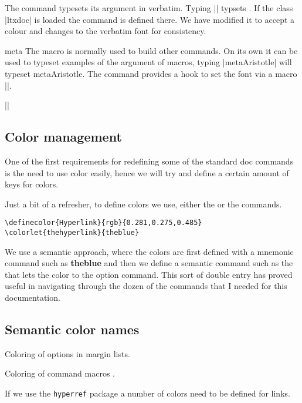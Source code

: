 \begin{macro}{\cmd} The command \cmd{\cmd} typesets its argument in
  verbatim. Typing |\cmd{\cmd}| typsets \cmd{\cmd}. If the class
  |ltxdoc| is loaded the command is defined there. We have modified
  it to accept a colour and changes to the verbatim font 
  for consistency.
\end{macro}

\begin{macro}{meta}
The macro  is normally used to build other commands. On its own it can be used to typeset
examples of the argument of macros, typing |meta{Aristotle}| will typeset meta{Aristotle}. The command provides a hook to set the font via a macro |\meta@font@select|. 
\end{macro}


|\def\meta@font@select{\upshape\color{black}}|


\subsection{Color management}
One of the first requirements for redefining some of the standard doc commands is the need to use color easily, hence we will try and define a certain amount of keys for colors.

Just a bit of a refresher, to define colors we use, either the  or the  commands.


\begin{verbatim}
\definecolor{Hyperlink}{rgb}{0.281,0.275,0.485}
\colorlet{thehyperlink}{theblue}
\end{verbatim}


We use a semantic approach, where the colors are first defined with a mnemonic command such as {\bfseries\textcolor{theblue}{theblue}} and then we define a semantic command such as the that lets the color to the option command. This sort of double entry has proved useful in navigating through the dozen of the commands that I needed for this documentation.


\subsection{Semantic color names}
\begin{marglist}
\item [\option{theoption}] Coloring of options in margin lists.
\item [\option{themacro}] Coloring of command macros .
\item [\option{hyperlink}] If we use the \texttt{hyperref} package a number of colors need to be defined for links.
\end{marglist}

